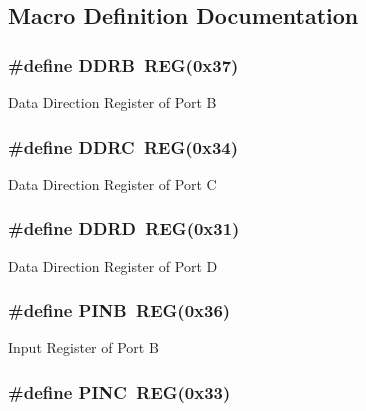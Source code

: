 \subsection{Macro Definition Documentation}
\hypertarget{group__PORTS_ga924a54df722121bc98383bdec5ae1898}{
\subsubsection[{D\+D\+R\+B}]{\setlength{\rightskip}{0pt plus 5cm}\#define D\+D\+R\+B~{\bf R\+E\+G}(0x37)}}\label{group__PORTS_ga924a54df722121bc98383bdec5ae1898}
Data Direction Register of Port B \hypertarget{group__PORTS_ga13004c90aa4b54f1bc3fbd25ad3fd645}{
\subsubsection[{D\+D\+R\+C}]{\setlength{\rightskip}{0pt plus 5cm}\#define D\+D\+R\+C~{\bf R\+E\+G}(0x34)}}\label{group__PORTS_ga13004c90aa4b54f1bc3fbd25ad3fd645}
Data Direction Register of Port C \hypertarget{group__PORTS_gae24189eeb3ce4bccd97d46e88f494e0a}{
\subsubsection[{D\+D\+R\+D}]{\setlength{\rightskip}{0pt plus 5cm}\#define D\+D\+R\+D~{\bf R\+E\+G}(0x31)}}\label{group__PORTS_gae24189eeb3ce4bccd97d46e88f494e0a}
Data Direction Register of Port D \hypertarget{group__PORTS_ga49f0e8289e962c02128f24b94d7aea7c}{
\subsubsection[{P\+I\+N\+B}]{\setlength{\rightskip}{0pt plus 5cm}\#define P\+I\+N\+B~{\bf R\+E\+G}(0x36)}}\label{group__PORTS_ga49f0e8289e962c02128f24b94d7aea7c}
Input Register of Port B \hypertarget{group__PORTS_ga0545e73dc7ae14b1f62293c1feba3983}{
\subsubsection[{P\+I\+N\+C}]{\setlength{\rightskip}{0pt plus 5cm}\#define P\+I\+N\+C~{\bf R\+E\+G}(0x33)}}\label{group__PORTS_ga0545e73dc7ae14b1f62293c1feba3983}
